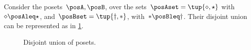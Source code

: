\begin{example}
    Consider the posets~$\posA,\posB$, over the sets~$\posAset=\tup{\diamond, \star}$ with~$\diamond \posAleq \star$, and~$\posBset=\tup{\dagger,\ast}$, with~$\ast \posBleq \dagger$.
    Their disjoint union can be represented as in \cref{fig:poset-coproduct}.

    \begin{figure}[h!]
        \centering
        \caption{Disjoint union of posets.}
        \label{fig:poset-coproduct}
    \end{figure}
\end{example}

